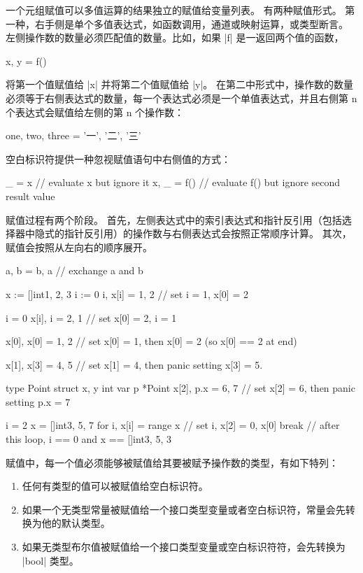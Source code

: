 一个元组赋值可以多值运算的结果独立的赋值给变量列表。
有两种赋值形式。
第一种，右手侧是单个多值表达式，如函数调用，通道或映射运算，或类型断言。
左侧操作数的数量必须匹配值的数量。比如，如果 \code|f| 是一返回两个值的函数，
\begin{golang}
x, y = f()
\end{golang}
将第一个值赋值给 \code|x| 并将第二个值赋值给 \code|y|。
在第二中形式中，操作数的数量必须等于右侧表达式的数量，每一个表达式必须是一个单值表达式，并且右侧第 n 个表达式会赋值给左侧的第 n 个操作数：
\begin{golang}
one, two, three = '一', '二', '三'
\end{golang}

空白标识符提供一种忽视赋值语句中右侧值的方式：
\begin{golang}
_ = x       // evaluate x but ignore it
x, _ = f()  // evaluate f() but ignore second result value
\end{golang}

赋值过程有两个阶段。
首先，左侧表达式中的索引表达式和指针反引用（包括选择器中隐式的指针反引用）的操作数与右侧表达式会按照正常顺序计算。
其次，赋值会按照从左向右的顺序展开。
\begin{golang}
a, b = b, a  // exchange a and b

x := []int{1, 2, 3}
i := 0
i, x[i] = 1, 2  // set i = 1, x[0] = 2

i = 0
x[i], i = 2, 1  // set x[0] = 2, i = 1

x[0], x[0] = 1, 2  // set x[0] = 1, then x[0] = 2 (so x[0] == 2 at end)

x[1], x[3] = 4, 5  // set x[1] = 4, then panic setting x[3] = 5.

type Point struct { x, y int }
var p *Point
x[2], p.x = 6, 7  // set x[2] = 6, then panic setting p.x = 7

i = 2
x = []int{3, 5, 7}
for i, x[i] = range x {  // set i, x[2] = 0, x[0]
	break
}
// after this loop, i == 0 and x == []int{3, 5, 3}
\end{golang}

赋值中，每一个值必须能够被赋值给其要被赋予操作数的类型，有如下特列：
\begin{enumerate}
\item 任何有类型的值可以被赋值给空白标识符。
\item 如果一个无类型常量被赋值给一个接口类型变量或者空白标识符，常量会先转换为他的默认类型。
\item 如果无类型布尔值被赋值给一个接口类型变量或空白标识符符，会先转换为 \code|bool| 类型。
\end{enumerate}

